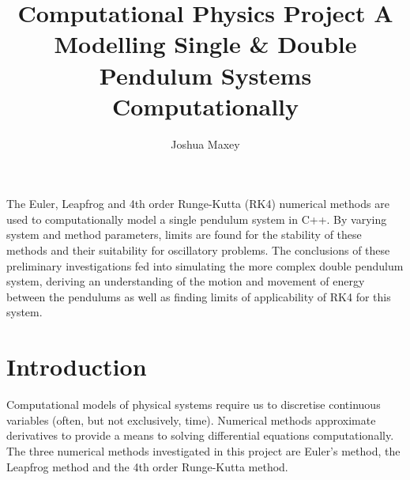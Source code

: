 \documentclass[11pt]{article}
\title{Computational Physics Project A \\ Modelling Single \& Double Pendulum Systems Computationally}
\author{Joshua Maxey}
\begin{document}
\maketitle

\begin{center}
\begin{it}
The Euler, Leapfrog and 4th order Runge-Kutta (RK4) numerical methods are used to computationally model a single pendulum system in C++. By varying system and method parameters, limits are found for the stability of these methods and their suitability for oscillatory problems. The conclusions of these preliminary investigations fed into simulating the more complex double pendulum system, deriving an understanding of the motion and movement of energy between the pendulums as well as finding limits of applicability of RK4 for this system.
\end{it}
\end{center}

\tableofcontents
\pagebreak

\section{Introduction}
Computational models of physical systems require us to discretise continuous variables (often, but not exclusively, time). Numerical methods approximate derivatives to provide a means to solving differential equations computationally. The three numerical methods investigated in this project are Euler's method, the Leapfrog method and the 4th order Runge-Kutta method.

\end{document}
